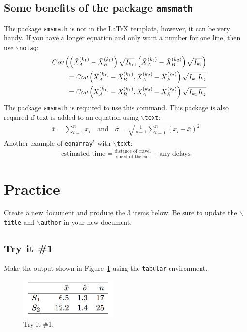 \documentclass[11pt]{article} %
\begin{document}
\subsection{Some benefits of the package \texttt{amsmath}}

The package \texttt{amsmath} is not in the LaTeX template, however, it can be very handy.
If you have a longer equation and only want a number for one line, then use \texttt{$\backslash$notag}:
\begin{eqnarray}
&&Cov\left( \left(\bar{X}_{A}^{(k_1)} - \bar{X}_{B}^{(k_1)}\right)\sqrt{I_{k_1}}, \left(\bar{X}_{A}^{(k_2)} - \bar{X}_{B}^{(k_2)}\right)\sqrt{I_{k_2}} \right) \notag \\
&&\quad= Cov\left( \bar{X}_{A}^{(k_1)} - \bar{X}_{B}^{(k_1)}, \bar{X}_{A}^{(k_2)} - \bar{X}_{B}^{(k_2)}\right) \sqrt{I_{k_1}I_{k_2}} \notag \\ %
&&\quad= Cov\left( \bar{X}_{A}^{(k_1)} - \bar{X}_{B}^{(k_1)}, \bar{X}_{A}^{(k_2)} - \bar{X}_{B}^{(k_2)}\right) \sqrt{I_{k_1}I_{k_2}}
\end{eqnarray}
The package \texttt{amsmath} is required to use this command. This package is also required if text is added to an equation using \texttt{$\backslash$text}:
\begin{eqnarray*}
\bar{x} = \sum_{i=1}^{n} x_i \quad \text{and} \quad \hat{\sigma} = \sqrt{\frac{1}{n-1}\sum_{i=1}^n(x_i-\bar{x})^2}
\end{eqnarray*}
Another example of \texttt{eqnarray$^*$} with \texttt{$\backslash$text}:
\begin{eqnarray*}
\text{estimated time} = \frac{\text{distance of travel}}{\text{speed of the car}} + \text{any delays}
\end{eqnarray*}

\section{Practice}

Create a new document and produce the 3 items below. Be sure to update the \texttt{$\backslash$title} and \texttt{$\backslash$author} in your new document.

\subsection{Try it \#1}

Make the output shown in Figure~\ref{tryIt1} using the \texttt{tabular} environment.
\begin{figure}[htbp]
   \centering
   \includegraphics[height=0.8in]{tryIt/tryIt1}
   \caption{Try it \#1.}
   \label{tryIt1}
\end{figure}
\end{document}
